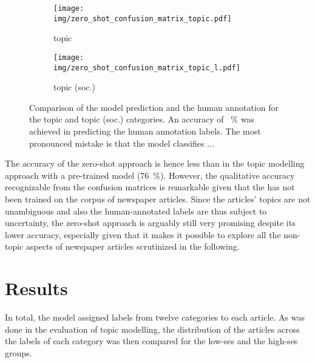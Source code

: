 \begin{figure}
    \centering
    \begin{subfigure}{0.48\textwidth}
        \centering
        \texttt{[image: img/zero\_shot\_confusion\_matrix\_topic.pdf]}
        \caption{topic}\label{fig:zero_shot_confusion_matrix_topic}
    \end{subfigure}
    \begin{subfigure}{0.48\textwidth}
        \centering
        \texttt{[image: img/zero\_shot\_confusion\_matrix\_topic\_l.pdf]}
        \caption{topic (soc.)}\label{fig:zero_shot_confusion_matrix_topic_l}
    \end{subfigure}
    \caption{Comparison of the model prediction and the human annotation for the topic and topic (soc.) categories. An accuracy of \SI{}{\percent} was achieved in predicting the human annotation labels. The most pronounced mistake is that the model classifies ...}\label{fig:zero_shot_confusion_matrices}
\end{figure}

The accuracy of the zero-shot approach is hence less than in the topic modelling approach with a pre-trained model (\SI{76}{\percent}). However, the qualitative accuracy recognizable from the confusion matrices is remarkable given that the has not been trained on the corpus of newspaper articles. Since the articles' topics are not unambiguous and also the human-annotated labels are thus subject to uncertainty, the zero-shot approach is arguably still very promising despite its lower accuracy, especially given that it makes it possible to explore all the non-topic aspects of newspaper articles scrutinized in the following.


\section{Results}\label{ch:supervised_results}
In total, the model assigned labels from twelve categories to each article. As was done in the evaluation of topic modelling, the distribution of the articles across the labels of each category was then compared for the low-\gls{ses} and the high-\gls{ses} groups.

